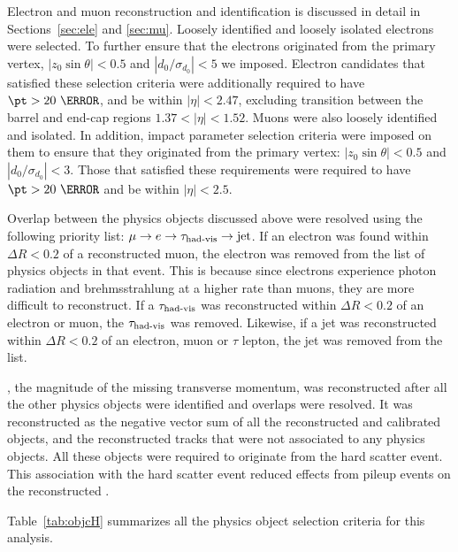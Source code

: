\par Electron and muon reconstruction and identification is discussed in detail in Sections~\ref{sec:ele} and 
\ref{sec:mu}. Loosely identified and loosely isolated electrons were selected. To further ensure that the electrons originated 
from the primary vertex, $|z_0\sin\theta|<0.5$ and $|d_0/\sigma_{d_0}|<5$ we imposed.  
Electron candidates that satisfied these selection criteria were additionally required 
to have $\pt>20~\GeV$, and be within $|\eta|<2.47$, excluding transition between the barrel and end-cap regions $1.37<|\eta|<1.52$.
Muons were also loosely identified and isolated. In addition, impact parameter selection 
criteria were imposed on them to ensure that they originated from the primary 
vertex: $|z_0\sin\theta|<0.5$ and $|d_0/\sigma_{d_0}|<3$. 
Those that satisfied these requirements were required to have $\pt>20~\GeV$ and be within $|\eta|<2.5$.  

\par Overlap between the physics objects discussed above were resolved using the following priority list: 
$\mu\to e\to\tau_{\text{had-vis}}\to\text{jet}$. If an electron was found within $\Delta R < 0.2$ 
of a reconstructed muon, the electron was removed from the list of physics objects in that event. This is 
because since electrons experience photon radiation and brehmsstrahlung at a higher rate than muons, they are   
more difficult to reconstruct. If a $\tau_{\text{had-vis}}$ was reconstructed within $\Delta R<0.2$ of an electron 
or muon, the $\tau_{\text{had-vis}}$ was removed. Likewise, if a jet was reconstructed within $\Delta R<0.2$ of an electron, muon 
or $\tau$ lepton, the jet was removed from the list.   

\par \met, the magnitude of the missing transverse momentum, was reconstructed after all 
the other physics objects were identified and overlaps were resolved. 
It was reconstructed as the negative vector sum of all the reconstructed and calibrated objects, and the reconstructed 
tracks that were not associated to any physics objects. All these objects were required to originate from the hard 
scatter event. This association with the hard scatter event reduced effects from pileup events on the reconstructed 
\met.

\par Table~\ref{tab:objcH} summarizes all the physics object selection criteria for this analysis.     

